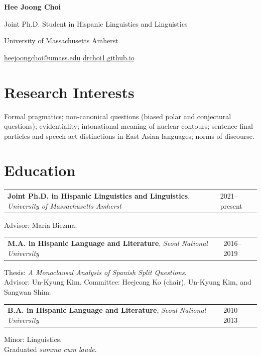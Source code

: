 \documentclass[10pt,letterpaper]{article}
\makeatletter
\newcommand{\datedentry}[2]{%
  \noindent\begin{tabularx}{\textwidth}{@{}X>{\raggedleft\arraybackslash}p{1.45in}@{}}
    #1 & \textcolor{muted}{#2}
  \end{tabularx}\par
}
\newcommand{\subentry}[1]{%
  \hspace*{0.9em}\begin{minipage}{\dimexpr\textwidth-0.9em\relax}
    \small #1
  \end{minipage}\par
}
\newcommand{\educationdetail}[1]{%
  \vspace{-1pt}\subentry{#1}
}
\newcommand{\educationgap}{\vspace{5pt}}
\makeatother
\begin{document}
\begin{center}
  {\LARGE\bfseries Hee Joong Choi}\par
  \vspace{3pt}
  {\normalsize Joint Ph.D. Student in Hispanic Linguistics and Linguistics}\par
  \vspace{2pt}
  University of Massachusetts Amherst\par
  \vspace{4pt}
  \href{mailto:heejoongchoi@umass.edu}{heejoongchoi@umass.edu}
  \enspace\textperiodcentered\enspace
  \href{https://drchoi1.github.io/}{drchoi1.github.io}
\end{center}

\vspace{3pt}

\section{Research Interests}

Formal pragmatics; non-canonical questions (biased polar and conjectural questions); evidentiality; intonational meaning of nuclear contours; sentence-final particles and speech-act distinctions in East Asian languages; norms of discourse.

\section{Education}

\datedentry{\textbf{Joint Ph.D. in Hispanic Linguistics and Linguistics}, \textit{University of Massachusetts Amherst}}{2021--present}
\educationdetail{Advisor: María Biezma.}


\educationgap
\datedentry{\textbf{M.A. in Hispanic Language and Literature}, \textit{Seoul National University}}{2016--2019}
\educationdetail{Thesis: \textit{A Monoclausal Analysis of Spanish Split Questions}.\\
Advisor: Un-Kyung Kim. Committee: Heejeong Ko (chair), Un-Kyung Kim, and Sangwan Shim.}

\educationgap
\datedentry{\textbf{B.A. in Hispanic Language and Literature}, \textit{Seoul National University}}{2010--2013}
\educationdetail{Minor: Linguistics.\\
Graduated \textit{summa cum laude}.}
\end{document}
